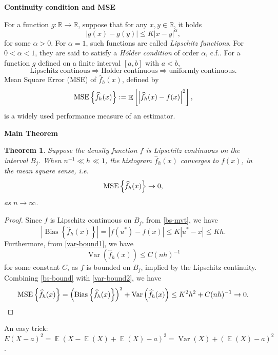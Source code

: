 \documentclass[19pt,landscaoe]{article}
\newtheorem{thm}{Theorem}%
\DeclareMathOperator{\E}{\mathbb{E}}
\newcommand{\R}{\mathbb{R}}
\DeclareMathOperator{\Var}{\mathrm{Var}}
\DeclareMathOperator{\var}{\mathrm{Var}}
\DeclareMathOperator{\bs}{\mathrm{Bias}}
\begin{document}
\newpage
{\LARGE\centerline{\textbf{Continuity condition and MSE}}}
\vskip25pt
\begin{minipage}{.9\textwidth}
    \Large
        For a function $g:\R\to\R$, suppose that for any $x,y\in\R$, it holds 
        \begin{equation}
            |g(x)-g(y)|\le K|x-y|^\alpha,
        \end{equation}
        for some $\alpha>0$. 
        For $\alpha=1$, such functions are called {\it Lipschitz functions}. For $0<\alpha<1$, they are said to satisfy a {\it H\"older condition} of order $\alpha$, c.f.\cite[Page~56]{Dudley02}. 
\vskip 5pt
        For a function $g$ defined on a finite interval $[a,b]$ with $a<b$, 
        $$\mathrm{Lipschitz~continous}\Rightarrow \mathrm{H\ddot{o}lder~continuous}\Rightarrow \mathrm{uniformly~continuous}.$$
Mean Square Error (MSE) of $\widehat{f}_h(x)$, defined by 
\begin{eqnarray}
    {\rm MSE}\left\{\widehat{f}_h(x)\right\}:=\E\left[\left|\widehat{f}_h(x)-f(x)\right|^2\right],
\end{eqnarray}
is a widely used performance measure of an estimator. 
\end{minipage}

\newpage
{\LARGE\centerline{\textbf{Main Theorem}}}
\vskip25pt
\begin{minipage}{.9\textwidth}
    \large
\begin{thm}\label{thm1-L2}
    Suppose the density function $f$ is Lipschitz continuous on the interval $B_j$. When $n^{-1}\ll h\ll1$, the histogram $\widehat{f}_h(x)$ converges to $f(x)$, in the mean square sense,  i.e. 
    \begin{equation}
        {\rm MSE}\left\{\widehat{f}_h(x)\right\}\to0,
    \end{equation}
    as $n\to\infty$.
\end{thm}
\begin{proof}
    Since $f$ is Lipschitz continuous on $B_j$, from \eqref{bs-mvt}, we have
    \begin{equation}\label{bs-bound}
        \left|\bs\left\{\widehat{f}_h(x)\right\}\right|=\left|f(u^*)-f(x)\right|\le K|u^*-x|\le Kh.
    \end{equation}
    Furthermore, from \eqref{var-bound1}, we have 
    \begin{equation}\label{var-bound2}
        \var\left(\widehat{f}_h(x)\right)\le C(nh)^{-1}
    \end{equation} for some constant $C$, 
    as $f$ is bounded on $B_j$, implied by the Lipschitz continuity. Combining \eqref{bs-bound} with \eqref{var-bound2}, we have
    \begin{equation} \label{bound-mse1}
        {\rm MSE}\left\{\widehat{f}_h(x)\right\} =\left(\bs\left\{\widehat{f}_h(x)\right\}\right)^2+\var\left(\widehat{f}_h(x)\right)\le K^2h^2+C(nh)^{-1}\to0.
    \end{equation}
\end{proof}
{\small An easy trick: $E(X-a)^2=\E(X-\E(X)+\E(X)-a)^2=\Var(X)+(\E(X)-a)^2$.}
\end{minipage}
\end{document}
